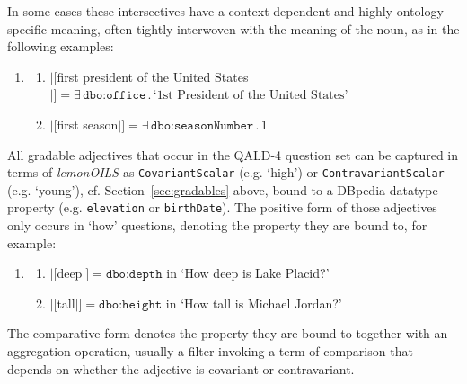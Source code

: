 \documentclass[11pt]{article}
\begin{document}
In some cases these intersectives have a context-dependent and highly ontology-specific meaning, 
often tightly interwoven with the meaning of the noun, as in the following examples:
\begin{enumerate}
\item \begin{enumerate}
\item $|[$first president of the United States$|]=\exists\,\texttt{dbo:office}\,.\,\text{`1st President of the United States'}$
\item $|[$first season$|]=\exists\,\texttt{dbo:seasonNumber}\,.\,1$
\end{enumerate}
\end{enumerate}

All gradable adjectives that occur in the QALD-4 question set can be captured in terms of \emph{lemonOILS} 
as \texttt{CovariantScalar} (e.g. `high') or \texttt{ContravariantScalar} (e.g. `young'), cf. Section~\ref{sec:gradables} above, 
bound to a DBpedia datatype property (e.g. \texttt{elevation} or \texttt{birthDate}). 
The positive form of those adjectives only occurs in `how' questions, denoting the property they are bound to, for example:
\begin{enumerate} 
\item \begin{enumerate}
 \item $|[$deep$|]=\texttt{dbo:depth}$ in `How deep is Lake Placid?'
 \item $|[$tall$|]=\texttt{dbo:height}$ in `How tall is Michael Jordan?'
 \end{enumerate}
\end{enumerate}
The comparative form denotes the property they are bound to together with an aggregation operation, usually a filter 
invoking a term of comparison that depends on whether the adjective is covariant or contravariant.
\end{document}

